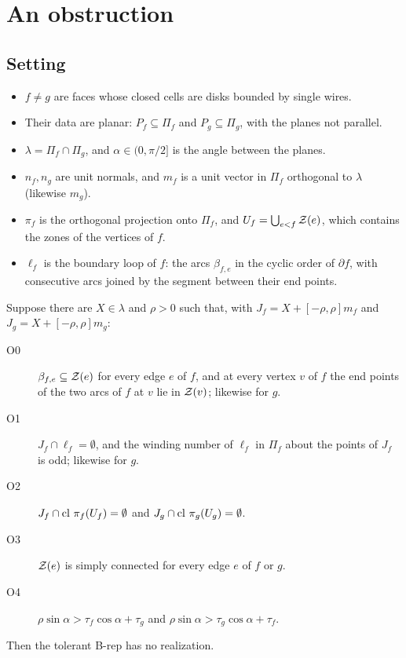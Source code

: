 \section{An obstruction}\label{sec:obstruction}

\subsection{Setting}
\begin{itemize}
\item $f\ne g$ are faces whose closed cells are disks bounded by single wires.
\item Their data are planar: $P_f\subseteq\Pi_f$ and $P_g\subseteq\Pi_g$, with the planes not parallel.
\item $\lambda=\Pi_f\cap\Pi_g$, and $\alpha\in(0,\pi/2]$ is the angle between the planes.
\item $n_f,n_g$ are unit normals, and $m_f$ is a unit vector in $\Pi_f$ orthogonal to $\lambda$ (likewise $m_g$).
\item $\pi_f$ is the orthogonal projection onto $\Pi_f$, and $U_f=\bigcup_{e<f}\mathcal{Z}(e)$, which contains the zones
of the vertices of $f$.
\item $\ell_f$ is the boundary loop of $f$: the arcs $\beta_{f,e}$ in the cyclic order of $\partial f$, with
consecutive arcs joined by the segment between their end points.
\end{itemize}

\begin{theorem}[Obstruction]\label{thm:obstruction}
Suppose there are $X\in\lambda$ and $\rho>0$ such that, with $J_f=X+[-\rho,\rho]m_f$ and $J_g=X+[-\rho,\rho]m_g$:
\begin{description}
\item[O0] $\beta_{f,e}\subseteq\mathcal{Z}(e)$ for every edge $e$ of $f$, and at every vertex $v$ of $f$ the end points of
the two arcs of $f$ at $v$ lie in $\mathcal{Z}(v)$; likewise for $g$.
\item[O1] $J_f\cap\ell_f=\emptyset$, and the winding number of $\ell_f$ in $\Pi_f$ about the points of $J_f$ is
odd; likewise for $g$.
\item[O2] $J_f\cap\operatorname{cl}\,\pi_f(U_f)=\emptyset$ and $J_g\cap\operatorname{cl}\,\pi_g(U_g)=\emptyset$.
\item[O3] $\mathcal{Z}(e)$ is simply connected for every edge $e$ of $f$ or $g$.
\item[O4] $\rho\sin\alpha>\tau_f\cos\alpha+\tau_g$ and $\rho\sin\alpha>\tau_g\cos\alpha+\tau_f$.
\end{description}
Then the tolerant B-rep has no realization.
\end{theorem}

